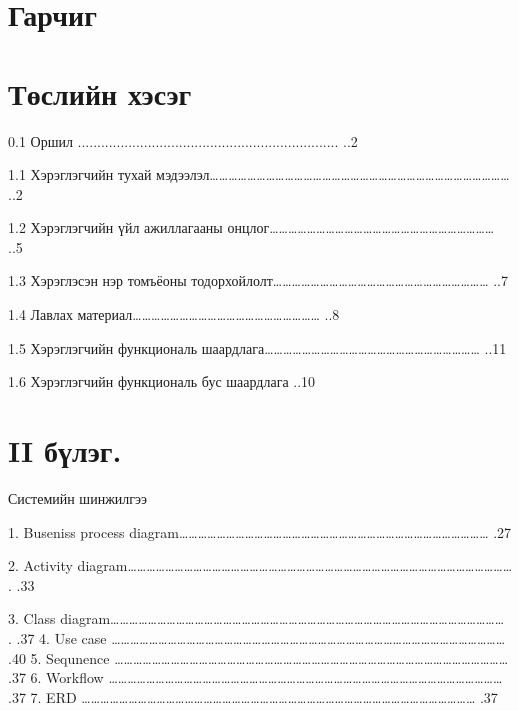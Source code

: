 \documentclass[12pt]{article}
\begin{document}
	
	
	
\section     {Гарчиг}
\section     {Төслийн хэсэг}
               0.1  Оршил ...................................................................            ..2
               
               1.1  Хэрэглэгчийн тухай мэдээлэл……………………………………………………………………………………                    ..2
               
               1.2  Хэрэглэгчийн үйл ажиллагааны онцлог………………………………………………………………                              ..5
               
               1.3  Хэрэглэсэн нэр томъёоны тодорхойлолт……………………………………………………………                         ..7
               
               1.4  Лавлах материал……………………………………………………                    ..8
               
               1.5  Хэрэглэгчийн функциональ шаардлага……………………………………………………………                            ..11
               
               1.6  Хэрэглэгчийн функциональ бус шаардлага                                                   ..10
               
\section     {II бүлэг.}  Системийн шинжилгээ

               1.   Buseniss process diagram………………………………………………………………………………………               
                .27
               
               2.	Activity diagram……………………………………………………………………………………………………………                    . .33
               
               3.	Class diagram………………………………………………………………………………………………………………                   . .37
               4.   Use case
               ………………………………………………………………………………………………………………                  
                .40
               5.   Sequnence 
               ………………………………………………………………………………………………………………                   
                .37
               6.   Workflow
               ………………………………………………………………………………………………………………                   
                .37
               7.   ERD 
               ………………………………………………………………………………………………………………                   
                .37
                
\end{document}
